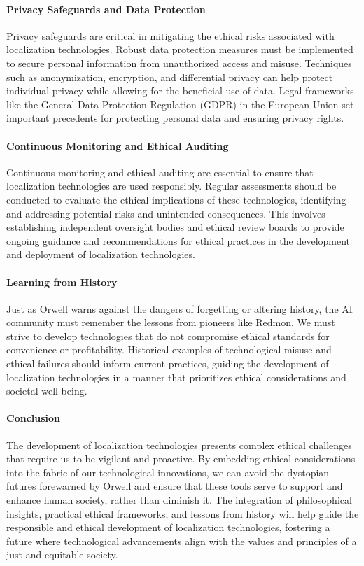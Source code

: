 \paragraph{Privacy Safeguards and Data Protection}
Privacy safeguards are critical in mitigating the ethical risks associated with localization technologies. Robust data protection measures must be implemented to secure personal information from unauthorized access and misuse. Techniques such as anonymization, encryption, and differential privacy can help protect individual privacy while allowing for the beneficial use of data. Legal frameworks like the General Data Protection Regulation (GDPR) in the European Union set important precedents for protecting personal data and ensuring privacy rights.

\paragraph{Continuous Monitoring and Ethical Auditing}
Continuous monitoring and ethical auditing are essential to ensure that localization technologies are used responsibly. Regular assessments should be conducted to evaluate the ethical implications of these technologies, identifying and addressing potential risks and unintended consequences. This involves establishing independent oversight bodies and ethical review boards to provide ongoing guidance and recommendations for ethical practices in the development and deployment of localization technologies.

\paragraph{Learning from History}
Just as Orwell warns against the dangers of forgetting or altering history, the AI community must remember the lessons from pioneers like Redmon. We must strive to develop technologies that do not compromise ethical standards for convenience or profitability. Historical examples of technological misuse and ethical failures should inform current practices, guiding the development of localization technologies in a manner that prioritizes ethical considerations and societal well-being.

\paragraph{Conclusion}
The development of localization technologies presents complex ethical challenges that require us to be vigilant and proactive. By embedding ethical considerations into the fabric of our technological innovations, we can avoid the dystopian futures forewarned by Orwell and ensure that these tools serve to support and enhance human society, rather than diminish it. The integration of philosophical insights, practical ethical frameworks, and lessons from history will help guide the responsible and ethical development of localization technologies, fostering a future where technological advancements align with the values and principles of a just and equitable society.


